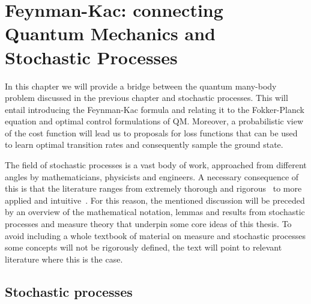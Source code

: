 
\ifpdf
\graphicspath{{Chapter3/Figs/Raster/}{Chapter3/Figs/PDF/}{Chapter3/Figs/}}
\else
\graphicspath{{Chapter3/Figs/Vector/}{Chapter3/Figs/}}
\fi


\newtheorem{theorem}{Theorem}[section]
\newtheorem{corollary}{Corollary}[theorem]
\newtheorem{lemma}[theorem]{Lemma}
\newtheorem{definition}{Definition}[section]

\chapter{Feynman-Kac: connecting Quantum Mechanics and Stochastic Processes}
\label{chapter3}
In this chapter we will provide a bridge between the quantum many-body problem discussed in the previous chapter and stochastic processes. This will entail introducing the Feynman-Kac formula and relating it to the Fokker-Planck equation and optimal control formulations of QM. Moreover, a probabilistic view of the cost function will lead us to proposals for loss functions that can be used to learn optimal transition rates and consequently sample the ground state.

The field of stochastic processes is a vast body of work, approached from different angles by mathematicians, physicists and engineers. A necessary consequence of this is that the literature ranges from extremely thorough and rigorous~\cite{rogers1994diffusions, rogers2000diffusions} to more applied and intuitive~\cite{sarkka2019applied}. For this reason, the mentioned discussion will be preceded by an overview of the mathematical notation, lemmas and results from stochastic processes and measure theory that underpin some core ideas of this thesis. To avoid including a whole textbook of material on measure and stochastic processes some concepts will not be rigorously defined, the text will point to relevant literature where this is the case.

\section{Stochastic processes}
\label{subsec:fk-stoch}
